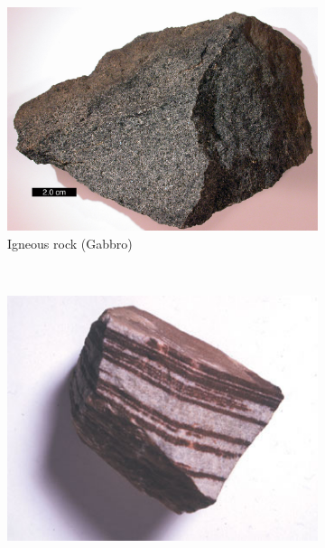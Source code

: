\documentclass[a4paper,12pt]{report}
\begin{document}
\begin{figure}[]
        \centering
        \begin{subfigure}[b]{0.3\textwidth}
                \centering
                \includegraphics[width=\textwidth]{thesis/geo/gabbro.jpg}
                \caption{Igneous rock (Gabbro)}
                \label{fig:gull}
        \end{subfigure}%
        ~ %
        \begin{subfigure}[b]{0.3\textwidth}
                \centering
                \includegraphics[width=\textwidth]{thesis/geo/sandstone.jpg}

\end{subfigure}
\end{figure}
\end{document}
